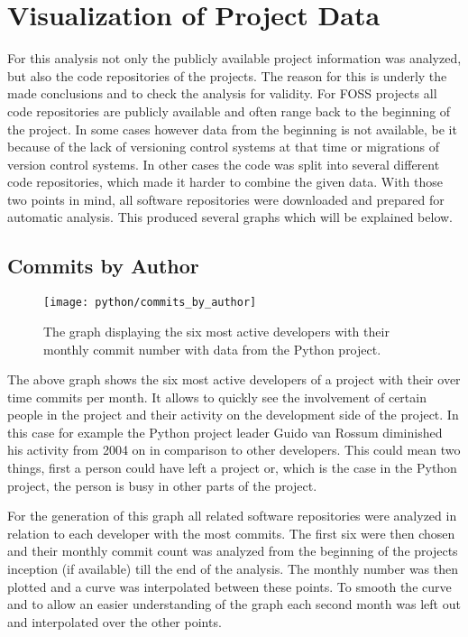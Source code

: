 
\section{Visualization of Project Data} %

For this analysis not only the publicly available project information was
analyzed, but also the code repositories of the projects. The reason for this
is underly the made conclusions and to check the analysis for validity. For
\ac{FOSS} projects all code repositories are publicly available and often range
back to the beginning of the project. In some cases however data from the
beginning is not available, be it because of the lack of versioning control
systems at that time or migrations of version control systems. In other cases
the code was split into several different code repositories, which made it
harder to combine the given data. With those two points in mind, all software
repositories were downloaded and prepared for automatic analysis. This produced
several graphs which will be explained below.

\subsection{Commits by Author} %

\begin{figure}[h!t]
  \centering
  \texttt{[image: python/commits\_by\_author]}
  \caption{The graph displaying the six most active developers with their
  monthly commit number with data from the Python project.}
\end{figure}

The above graph shows the six most active developers of a project with their
over time commits per month. It allows to quickly see the involvement of
certain people in the project and their activity on the development side of the
project. In this case for example the Python project leader Guido van Rossum
diminished his activity from 2004 on in comparison to other developers. This
could mean two things, first a person could have left a project or, which is
the case in the Python project, the person is busy in other parts of the
project.

For the generation of this graph all related software repositories were
analyzed in relation to each developer with the most commits. The first six
were then chosen and their monthly commit count was analyzed from the beginning
of the projects inception (if available) till the end of the analysis. The
monthly number was then plotted and a curve was interpolated between these
points. To smooth the curve and to allow an easier understanding of the graph
each second month was left out and interpolated over the other points.

